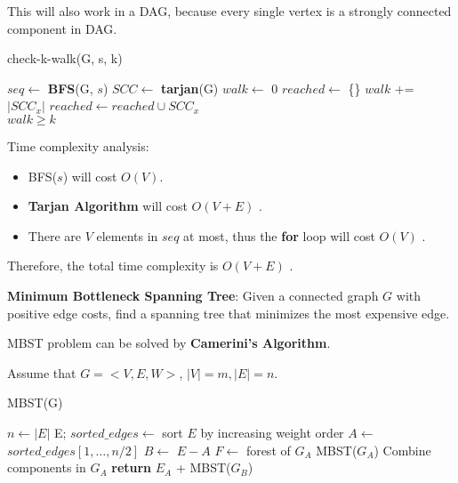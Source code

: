 \documentclass{article}
\newcounter{exercise}
\newcommand{\<}{
    \langle}
\renewcommand{\>}{
    \rangle}
\begin{document}
{This will also work in a DAG, because every single vertex is a strongly connected component in DAG.


\begin{algorithm}[htb]
\caption{check-k-walk(G, s, k)}
\begin{algorithmic}[1]
\State $seq \leftarrow$ \textbf{BFS}(G, $s$)
\State $SCC \leftarrow$ \textbf{tarjan}(G)
\State $walk \leftarrow$ 0
\State $reached \leftarrow$ \{\}
    \State $walk$ += $|SCC_x|$
    \State $reached \leftarrow reached \cup SCC_x$
    \EndIf
\EndFor \\
\Return $walk \ge k$
\end{algorithmic}
\end{algorithm}

Time complexity analysis:
\begin{itemize}
    \item BFS($s$) will cost $O(V)$.
    \item \textbf{Tarjan Algorithm} will cost $O(V+E)$ .
    \item There are $V$ elements in $seq$ at most, thus the \textbf{for} loop will cost $O(V)$ .
\end{itemize}

Therefore, the total time complexity is $O(V+E)$ .


\begin{exercise}
\textbf{Minimum Bottleneck Spanning Tree}: Given a connected graph $ G $ with positive edge costs, find a
spanning tree that {minimizes the most expensive edge}.
\end{exercise}

MBST problem can be solved by \textbf{Camerini's Algorithm}.

Assume that $G=<V, E, W>$, $|V| = m, |E| = n$.

\begin{algorithm}[htb]
\caption{MBST(G)}
\begin{algorithmic}[1]
\State $n \leftarrow |E|$
    \Return E;
\Else 
    \State $sorted\_edges \leftarrow $ sort $E$ by increasing weight order
    \State $A \leftarrow$ $sorted\_edges[1, \dots, n/2]$
    \State $B \leftarrow$ $E-A$
    \State $F \leftarrow$ forest of $G_A$
        \Return MBST($G_A$)
    \Else
        \State Combine components in $G_A$
        \State \textbf{return} $E_A$ + MBST($G_B$)
    \EndIf
\EndIf
\end{algorithmic}
\end{algorithm}

}
\end{document}
